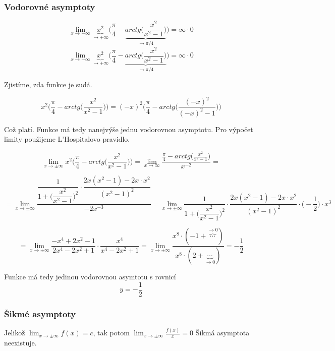 \subsubsection{Vodorovné asymptoty}

\begin{displaymath}
\lim_{x \to - \infty}\underbrace{x^2}_{\rightarrow+\infty}\Big(\frac{\pi}{4}-\underbrace{arctg\Big(\frac{x^2}{x^2-1}\Big)}_{\rightarrow \pi/4}\Big) = \infty \cdot 0
\end{displaymath}
\begin{displaymath}
\lim_{x \to - \infty}\underbrace{x^2}_{\rightarrow+\infty}\Big(\frac{\pi}{4}-\underbrace{arctg\Big(\frac{x^2}{x^2-1}\Big)}_{\rightarrow \pi/4}\Big) = \infty \cdot 0
\end{displaymath}

Zjistíme, zda funkce je sudá.

\begin{displaymath}
x^2\Big(\frac{\pi}{4}-arctg\Big(\frac{x^2}{x^2-1}\Big)\Big) = 
(-x)^2\Big(\frac{\pi}{4}-arctg\Big(\frac{(-x)^2}{(-x)^2-1}\Big)\Big)
\end{displaymath}

Což platí. Funkce má tedy nanejvýše jednu vodorovnou asymptotu. Pro výpočet limity použijeme L'Hospitalovo pravidlo.

\begin{displaymath}
\lim_{x \to \pm \infty}x^2\Big(\frac{\pi}{4}-arctg\Big(\frac{x^2}{x^2-1}\Big)\Big) = \lim_{x \to \infty}\frac{\frac{\pi}{4}-arctg\Big(\frac{x^2}{x^2-1}\Big)}{x^{-2}} =
\end{displaymath}

\begin{displaymath}
= \lim_{x \to \pm \infty} \dfrac{\dfrac{1}{1+\Big(\dfrac{x^2}{x^2-1}\Big)^2}\cdot\dfrac{2x(x^2-1)-2x\cdot x^2}{(x^2-1)^2}}{-2x^{-3}} = \lim_{x \to \pm \infty}\dfrac{1}{1+\Big(\dfrac{x^2}{x^2-1}\Big)^2}\cdot\dfrac{2x(x^2-1)-2x\cdot x^2}{(x^2-1)^2} \cdot \Big(-\dfrac{1}{2}\Big) \cdot x^3
\end{displaymath}

\begin{displaymath}
= \lim_{x \to \pm \infty} \frac{-x^4+2x^2-1}{2x^4-2x^2+1} \cdot \frac{x^4}{x^4-2x^2+1} = \lim_{x \to \pm \infty} \frac {x^8\cdot(-1+ \overbrace{\cdots}^{\rightarrow0})}{x^8\cdot (2 +\underbrace{\cdots}_{\rightarrow0})} = -\frac{1}{2}
\end{displaymath}

Funkce má tedy jedinou vodorovnou asymtotu s rovnicí
\begin{displaymath}
y = - \frac{1}{2}
\end{displaymath}

\subsubsection{Šikmé asymptoty}

Jelikož $\lim_{x \to \pm \infty} f(x) = c$, tak potom $\lim_{x \to \pm \infty} \frac{f(x)}{x} = 0$ Šikmá asymptota neexistuje. 
